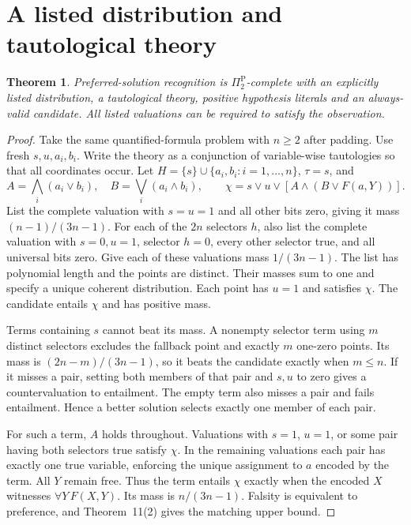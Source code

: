 \documentclass[11pt,a4paper]{amsart}
\newtheorem{theorem}{Theorem}
\begin{document}
\section{A listed distribution and tautological theory}
\begin{theorem}
Preferred-solution recognition is $\Pi_2^{\mathrm P}$-complete with an explicitly listed distribution, a tautological theory, positive hypothesis literals and an always-valid candidate. All listed valuations can be required to satisfy the observation.
\end{theorem}
\begin{proof}
Take the same quantified-formula problem with $n\geq2$ after padding. Use fresh $s,u,a_i,b_i$. Write the theory as a conjunction of variable-wise tautologies so that all coordinates occur. Let $H=\{s\}\cup\{a_i,b_i:i=1,\ldots,n\}$, $\tau=s$, and
\[
 A=\bigwedge_i(a_i\lor b_i),\quad B=\bigvee_i(a_i\land b_i),
 \qquad \chi=s\lor u\lor[A\land(B\lor F(a,Y))].
\]
List the complete valuation with $s=u=1$ and all other bits zero, giving it mass $(n-1)/(3n-1)$. For each of the $2n$ selectors $h$, also list the complete valuation with $s=0,u=1$, selector $h=0$, every other selector true, and all universal bits zero. Give each of these valuations mass $1/(3n-1)$. The list has polynomial length and the points are distinct. Their masses sum to one and specify a unique coherent distribution. Each point has $u=1$ and satisfies $\chi$. The candidate entails $\chi$ and has positive mass.

Terms containing $s$ cannot beat its mass. A nonempty selector term using $m$ distinct selectors excludes the fallback point and exactly $m$ one-zero points. Its mass is $(2n-m)/(3n-1)$, so it beats the candidate exactly when $m\leq n$. If it misses a pair, setting both members of that pair and $s,u$ to zero gives a countervaluation to entailment. The empty term also misses a pair and fails entailment. Hence a better solution selects exactly one member of each pair.

For such a term, $A$ holds throughout. Valuations with $s=1$, $u=1$, or some pair having both selectors true satisfy $\chi$. In the remaining valuations each pair has exactly one true variable, enforcing the unique assignment to $a$ encoded by the term. All $Y$ remain free. Thus the term entails $\chi$ exactly when the encoded $X$ witnesses $\forall Y\,F(X,Y)$. Its mass is $n/(3n-1)$. Falsity is equivalent to preference, and Theorem~11(2) gives the matching upper bound.
\end{proof}
\end{document}
